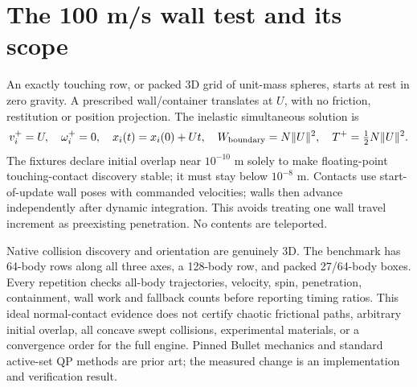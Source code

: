 \documentclass[11pt]{article}
\begin{document}
\section{The 100 m/s wall test and its scope}
An exactly touching row, or packed 3D grid of unit-mass spheres, starts at rest
in zero gravity. A prescribed wall/container translates at $U$, with no friction,
restitution or position projection. The inelastic simultaneous solution is
\begin{equation}
 v_i^+=U,\quad\omega_i^+=0,\quad x_i(t)=x_i(0)+Ut,\quad
 W_{\rm boundary}=N\lVert U\rVert^2,\quad T^+=\tfrac12N\lVert U\rVert^2.
\end{equation}
The fixtures declare initial overlap near $10^{-10}$ m solely to make
floating-point touching-contact discovery stable; it must stay below $10^{-8}$ m.
Contacts use start-of-update wall poses with commanded velocities; walls then
advance independently after dynamic integration. This avoids treating one wall
travel increment as preexisting penetration. No contents are teleported.

Native collision discovery and orientation are genuinely 3D. The benchmark has
64-body rows along all three axes, a 128-body row, and packed 27/64-body boxes.
Every repetition checks all-body trajectories, velocity, spin, penetration,
containment, wall work and fallback counts before reporting timing ratios.
This ideal normal-contact evidence does not certify chaotic frictional paths,
arbitrary initial overlap, all concave swept collisions, experimental materials,
or a convergence order for the full engine. Pinned Bullet mechanics and standard
active-set QP methods are prior art; the measured change is an implementation and
verification result.
\end{document}
